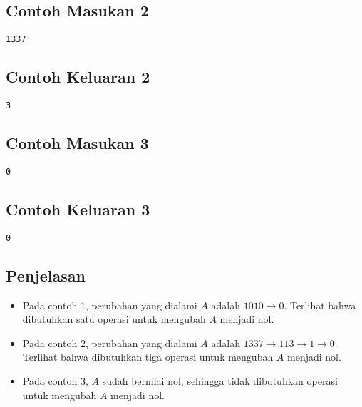 \documentclass{article}
\begin{document}
\begin{multicols}{2}
\subsection*{Contoh Masukan 2}
\begin{lstlisting}
1337
\end{lstlisting}
\null
\columnbreak
\subsection*{Contoh Keluaran 2}
\begin{lstlisting}
3
\end{lstlisting}
\vfill
\null
\end{multicols}

\begin{multicols}{2}
\subsection*{Contoh Masukan 3}
\begin{lstlisting}
0
\end{lstlisting}
\null
\columnbreak
\subsection*{Contoh Keluaran 3}
\begin{lstlisting}
0
\end{lstlisting}
\vfill
\null
\end{multicols}

\subsection*{Penjelasan}
\begin{itemize}
    \item Pada contoh 1, perubahan yang dialami $A$ adalah $1010 \longrightarrow 0$. Terlihat bahwa dibutuhkan satu operasi untuk mengubah $A$ menjadi nol.
    \item Pada contoh 2, perubahan yang dialami $A$ adalah $1337 \longrightarrow 113 \longrightarrow 1 \longrightarrow 0$. Terlihat bahwa dibutuhkan tiga operasi untuk mengubah $A$ menjadi nol.
    \item Pada contoh 3, $A$ sudah bernilai nol, sehingga tidak dibutuhkan operasi untuk mengubah $A$ menjadi nol.
\end{itemize}
\end{document}
